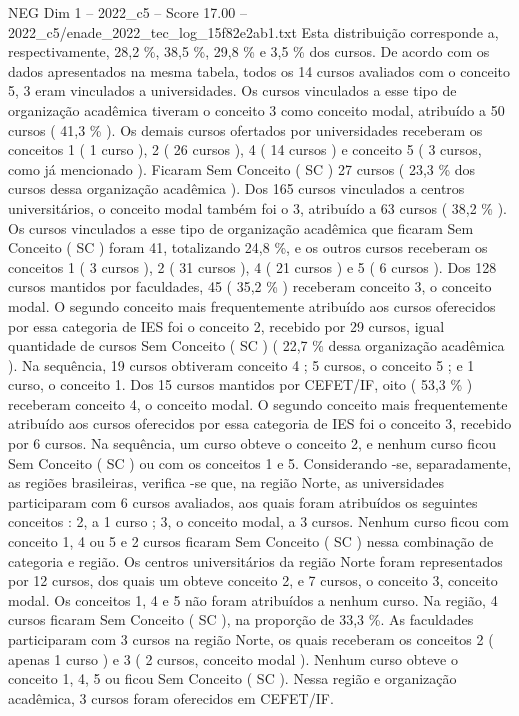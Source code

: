 \begin{textsample}{NEG Dim 1 – 2022\_c5 – Score 17.00 – 2022\_c5/enade\_2022\_tec\_log\_15f82e2ab1.txt}
Esta distribuição corresponde a, respectivamente, 28,2 \%, 38,5 \%, 29,8 \% e 3,5 \% dos cursos.
De acordo com os dados apresentados na mesma tabela, todos os 14 cursos avaliados com o conceito 5, 3 eram vinculados a universidades.
Os cursos vinculados a esse tipo de organização acadêmica tiveram o conceito 3 como conceito modal, atribuído a 50 cursos ( 41,3 \% ).
Os demais cursos ofertados por universidades receberam os conceitos 1 ( 1 curso ), 2 ( 26 cursos ), 4 ( 14 cursos ) e conceito 5 ( 3 cursos, como já mencionado ).
Ficaram Sem Conceito ( SC ) 27 cursos ( 23,3 \% dos cursos dessa organização acadêmica ).
Dos 165 cursos vinculados a centros universitários, o conceito modal também foi o 3, atribuído a 63 cursos ( 38,2 \% ).
Os cursos vinculados a esse tipo de organização acadêmica que ficaram Sem Conceito ( SC ) foram 41, totalizando 24,8 \%, e os outros cursos receberam os conceitos 1 ( 3 cursos ), 2 ( 31 cursos ), 4 ( 21 cursos ) e 5 ( 6 cursos ).
Dos 128 cursos mantidos por faculdades, 45 ( 35,2 \% ) receberam conceito 3, o conceito modal.
O segundo conceito mais frequentemente atribuído aos cursos oferecidos por essa categoria de IES foi o conceito 2, recebido por 29 cursos, igual quantidade de cursos Sem Conceito ( SC ) ( 22,7 \% dessa organização acadêmica ).
Na sequência, 19 cursos obtiveram conceito 4 ; 5 cursos, o conceito 5 ; e 1 curso, o conceito 1.
Dos 15 cursos mantidos por CEFET/IF, oito ( 53,3 \% ) receberam conceito 4, o conceito modal.
O segundo conceito mais frequentemente atribuído aos cursos oferecidos por essa categoria de IES foi o conceito 3, recebido por 6 cursos.
Na sequência, um curso obteve o conceito 2, e nenhum curso ficou Sem Conceito ( SC ) ou com os conceitos 1 e 5.
Considerando -se, separadamente, as regiões brasileiras, verifica -se que, na região Norte, as universidades participaram com 6 cursos avaliados, aos quais foram atribuídos os seguintes conceitos : 2, a 1 curso ; 3, o conceito modal, a 3 cursos.
Nenhum curso ficou com conceito 1, 4 ou 5 e 2 cursos ficaram Sem Conceito ( SC ) nessa combinação de categoria e região.
Os centros universitários da região Norte foram representados por 12 cursos, dos quais um obteve conceito 2, e 7 cursos, o conceito 3, conceito modal.
Os conceitos 1, 4 e 5 não foram atribuídos a nenhum curso.
Na região, 4 cursos ficaram Sem Conceito ( SC ), na proporção de 33,3 \%.
As faculdades participaram com 3 cursos na região Norte, os quais receberam os conceitos 2 ( apenas 1 curso ) e 3 ( 2 cursos, conceito modal ).
Nenhum curso obteve o conceito 1, 4, 5 ou ficou Sem Conceito ( SC ).
Nessa região e organização acadêmica, 3 cursos foram oferecidos em CEFET/IF.

\end{textsample}
